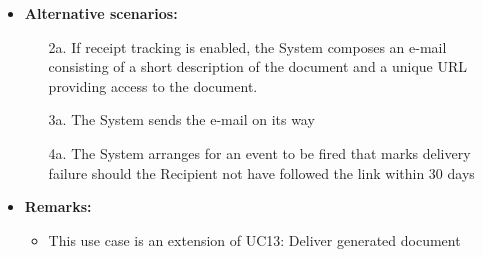 \documentclass[a4paper,10pt]{article}
\begin{document}
\begin{itemize}
    \item \textbf{Alternative scenarios:} 
    \begin{enumerate}
        \item [2a.] If receipt tracking is enabled, the System composes an e-mail consisting of a short description of the document and a unique URL providing access to the document.
        \item [3a.] The System sends the e-mail on its way
        \item [4a.] The System arranges for an event to be fired that marks delivery failure should the Recipient not have followed the link within 30 days
    \end{enumerate}
    
    \item \textbf{Remarks:}
        \begin{itemize}
            \item This use case is an extension of UC13: Deliver generated document
        \end{itemize}
\end{itemize}
\end{document}
